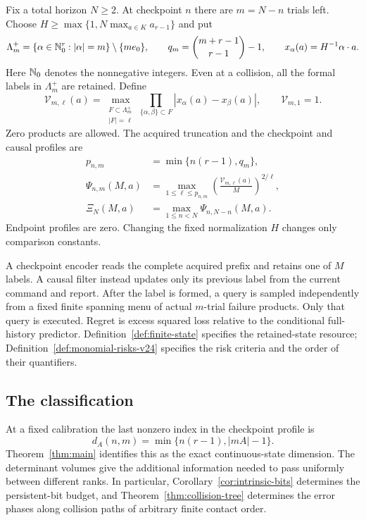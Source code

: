Fix a total horizon $N\ge2$. At checkpoint $n$ there are $m=N-n$
trials left. Choose
$H\ge\max\{1,N\max_{a\in K}a_{r-1}\}$ and put
\[
 \Lambda_m^+=\{\alpha\in\mathbb N_0^r:|\alpha|=m\}\setminus\{me_0\},
 \qquad q_m=\binom{m+r-1}{r-1}-1,
 \qquad x_\alpha(a)=H^{-1}\alpha\cdot a.
\]
Here $\mathbb N_0$ denotes the nonnegative integers. Even at a collision,
all the formal labels in $\Lambda_m^+$ are retained. Define
\[
 \mathcal V_{m,\ell}(a)=
 \max_{\substack{F\subset\Lambda_m^+\\|F|=\ell}}
       \prod_{\{\alpha,\beta\}\subset F}
           |x_\alpha(a)-x_\beta(a)|,
 \qquad \mathcal V_{m,1}=1.
\]
Zero products are allowed. The acquired truncation and the checkpoint
and causal profiles are
\[
 \begin{split}
 p_{n,m}&=\min\{n(r-1),q_m\},\\
 \Psi_{n,m}(M,a)&=
   \max_{1\le\ell\le p_{n,m}}
       \left(\frac{\mathcal V_{m,\ell}(a)}{M}\right)^{2/\ell},\\
 \Xi_N(M,a)&=\max_{1\le n<N}\Psi_{n,N-n}(M,a).
 \end{split}
\]
Endpoint profiles are zero. Changing the fixed normalization $H$
changes only comparison constants.

A checkpoint encoder reads the complete acquired prefix and retains
one of $M$ labels. A causal filter instead updates only its previous
label from the current command and report. After the label is formed,
a query is sampled independently from a fixed finite spanning menu of
actual $m$-trial failure products. Only that query is executed. Regret
is excess squared loss relative to the conditional full-history
predictor. Definition~\ref{def:finite-state} specifies the retained-state
resource; Definition~\ref{def:monomial-risks-v24} specifies the risk
criteria and the order of their quantifiers.

\subsection{The classification}


At a fixed calibration the last nonzero index in the checkpoint profile
is
\[
 d_A(n,m)=\min\{n(r-1),|mA|-1\}.
\]
Theorem~\ref{thm:main} identifies this as the exact continuous-state
dimension. The determinant volumes give the additional information
needed to pass uniformly between different ranks. In particular,
Corollary~\ref{cor:intrinsic-bits} determines the persistent-bit budget,
and Theorem~\ref{thm:collision-tree} determines the error phases along
collision paths of arbitrary finite contact order.


